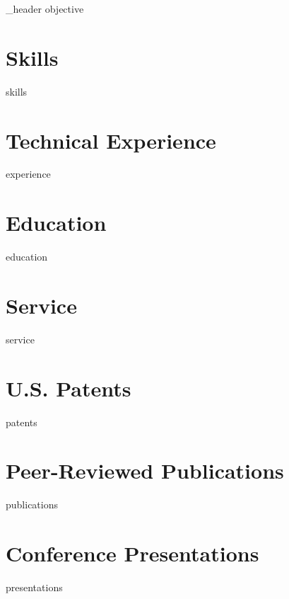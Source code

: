 \documentclass[letter,10pt]{article}
\author{Joelle Tori Maslak} %
\begin{document}
{_header}
{objective}

\raggedright

\section{Skills}
{skills}

\section{Technical Experience}
{experience}

\section{Education}
{education}

\section{Service}
{service}

\section{U.S. Patents}
{patents}

\section{Peer-Reviewed Publications}
{publications}

\section{Conference Presentations}
{presentations}
\end{document}
